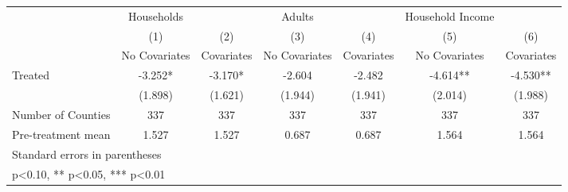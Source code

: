 {
\def\sym#1{\ifmmode^{#1}\else\(^{#1}\)\fi}
\begin{tabular}{l*{6}{c}}
\hline\hline
            &  Households   &               &      Adults   &               &Household Income   &               \\
            &\multicolumn{1}{c}{(1)}&\multicolumn{1}{c}{(2)}&\multicolumn{1}{c}{(3)}&\multicolumn{1}{c}{(4)}&\multicolumn{1}{c}{(5)}&\multicolumn{1}{c}{(6)}\\
            &\multicolumn{1}{c}{No Covariates}&\multicolumn{1}{c}{Covariates}&\multicolumn{1}{c}{No Covariates}&\multicolumn{1}{c}{Covariates}&\multicolumn{1}{c}{No Covariates}&\multicolumn{1}{c}{Covariates}\\
\hline
Treated     &      -3.252*  &      -3.170*  &      -2.604   &      -2.482   &      -4.614** &      -4.530** \\
            &     (1.898)   &     (1.621)   &     (1.944)   &     (1.941)   &     (2.014)   &     (1.988)   \\
\hline
Number of Counties&         337   &         337   &         337   &         337   &         337   &         337   \\
Pre-treatment mean&       1.527   &       1.527   &       0.687   &       0.687   &       1.564   &       1.564   \\
\hline\hline
\multicolumn{7}{l}{\footnotesize Standard errors in parentheses}\\
\multicolumn{7}{l}{\footnotesize * p<0.10, ** p<0.05, *** p<0.01}\\
\end{tabular}
}
